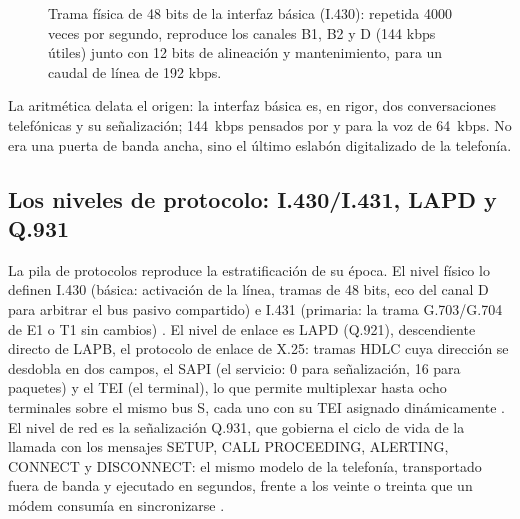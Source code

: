 \documentclass[12pt,a4paper]{article}
\begin{document}
\begin{figure}[h]
    \centering
    \caption{Trama física de 48 bits de la interfaz básica (I.430): repetida 4000 veces por segundo, reproduce los canales B1, B2 y D (144 kbps útiles) junto con 12 bits de alineación y mantenimiento, para un caudal de línea de 192 kbps.}
    \label{fig:trama}
\end{figure}

La aritmética delata el origen: la interfaz básica es, en rigor, dos conversaciones telefónicas y su señalización; 144~kbps pensados por y para la voz de 64~kbps. No era una puerta de banda ancha, sino el último eslabón digitalizado de la telefonía.

\subsection{Los niveles de protocolo: I.430/I.431, LAPD y Q.931}

La pila de protocolos reproduce la estratificación de su época. El nivel físico lo definen I.430 (básica: activación de la línea, tramas de 48 bits, eco del canal D para arbitrar el bus pasivo compartido) e I.431 (primaria: la trama G.703/G.704 de E1 o T1 sin cambios) \cite{itui430, itui431}. El nivel de enlace es LAPD (Q.921), descendiente directo de LAPB, el protocolo de enlace de X.25: tramas HDLC cuya dirección se desdobla en dos campos, el SAPI (el servicio: 0 para señalización, 16 para paquetes) y el TEI (el terminal), lo que permite multiplexar hasta ocho terminales sobre el mismo bus S, cada uno con su TEI asignado dinámicamente \cite{ituq921}. El nivel de red es la señalización Q.931, que gobierna el ciclo de vida de la llamada con los mensajes SETUP, CALL PROCEEDING, ALERTING, CONNECT y DISCONNECT: el mismo modelo de la telefonía, transportado fuera de banda y ejecutado en segundos, frente a los veinte o treinta que un módem consumía en sincronizarse \cite{ituq931}.
\end{document}
